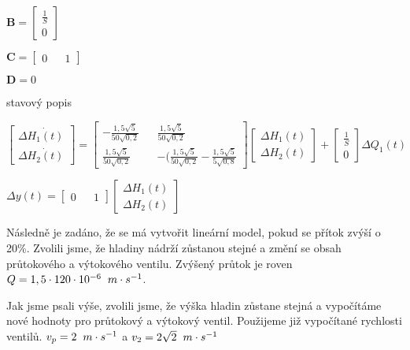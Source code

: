 \documentclass{article}
\begin{document}
\begin{center}
			\bigskip

			$\textbf{B}=\begin{bmatrix}
 			\frac{1}{S}\\
			0
			\end{bmatrix}$

			\bigskip

			$\textbf{C}=\begin{bmatrix}
			0 && 1
			\end{bmatrix}$

			\bigskip

			$\textbf{D}=0$

			\bigskip

			stavový popis

			\bigskip

			$\begin{bmatrix}
			\Delta \dot{H_1(t)}\\
			\Delta \dot{H_2(t)}
			\end{bmatrix}=\begin{bmatrix}
			-\frac{1,5\sqrt{5}}{50\sqrt{0,2}} && \frac{1,5\sqrt{5}}{50\sqrt{0,2}}\\
			\frac{1,5\sqrt{5}}{50\sqrt{0,2}}&& -(\frac{1,5\sqrt{5}}{50\sqrt{0,2}}-\frac{1,5\sqrt{5}}{5\sqrt{0,8}}
			\end{bmatrix}\begin{bmatrix}
			\Delta H_1(t)\\
			\Delta H_2(t)
			\end{bmatrix}+\begin{bmatrix}
			\frac{1}{S}\\
			0
			\end{bmatrix}\Delta Q_1(t)$

			\bigskip

			$\Delta y(t)=\begin{bmatrix}
			0 && 1
			\end{bmatrix}\begin{bmatrix}
			\Delta H_1(t)\\
			\Delta H_2(t)
			\end{bmatrix}$
			\end{center}

			Následně je zadáno, že se má vytvořit lineární model, pokud se přítok zvýší o 20\%. Zvolili jsme, že hladiny nádrží zůstanou stejné a změní se obsah průtokového a výtokového ventilu. Zvýšený průtok je roven $Q=1,5 \cdot 120 \cdot 10^{-6} \hspace{2mm} m \cdot s^{-1}$.

			Jak jsme psali výše, zvolili jsme, že výška hladin zůstane stejná a vypočítáme nové hodnoty pro průtokový a výtokový ventil. Použijeme již vypočítané rychlosti ventilů. $v_p=2 \hspace{2mm} m \cdot s^{-1}$ a $v_2=2\sqrt{2} \hspace{2mm} m \cdot s^{-1}$
\end{document}
